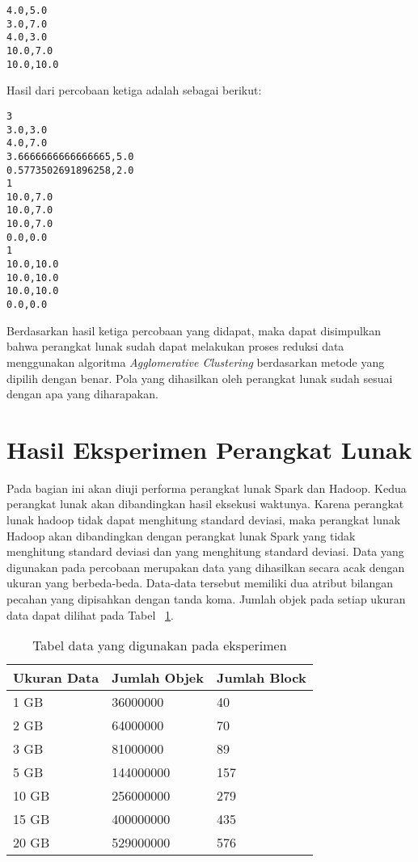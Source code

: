 \begin{itemize}
\begin{verbatim}
4.0,5.0
3.0,7.0
4.0,3.0
10.0,7.0
10.0,10.0
\end{verbatim}

Hasil dari percobaan ketiga adalah sebagai berikut:

\begin{verbatim}
3
3.0,3.0
4.0,7.0
3.6666666666666665,5.0
0.5773502691896258,2.0
1
10.0,7.0
10.0,7.0
10.0,7.0
0.0,0.0
1
10.0,10.0
10.0,10.0
10.0,10.0
0.0,0.0
\end{verbatim}

 
\end{itemize}

Berdasarkan hasil ketiga percobaan yang didapat, maka dapat disimpulkan bahwa perangkat lunak sudah dapat melakukan proses reduksi data menggunakan algoritma \textit{Agglomerative Clustering} berdasarkan metode yang dipilih dengan benar. Pola yang dihasilkan oleh perangkat lunak sudah sesuai dengan apa yang diharapakan.

\section{Hasil Eksperimen Perangkat Lunak}

Pada bagian ini akan diuji performa perangkat lunak Spark dan Hadoop. Kedua perangkat lunak akan dibandingkan hasil eksekusi waktunya. Karena perangkat lunak hadoop tidak dapat menghitung standard deviasi, maka perangkat lunak Hadoop akan dibandingkan dengan perangkat lunak Spark yang tidak menghitung standard deviasi dan yang menghitung standard deviasi. Data yang digunakan pada percobaan merupakan data yang dihasilkan secara acak dengan ukuran yang berbeda-beda. Data-data tersebut memiliki dua atribut bilangan pecahan yang dipisahkan dengan tanda koma. Jumlah objek pada setiap ukuran data dapat dilihat pada Tabel ~\ref{tab:exdata}.\\

\begin{table}[H] 
	\centering 
	\caption{Tabel data yang digunakan pada eksperimen}
	\label{tab:exdata}
	\begin{tabular}{|p{2cm}|p{2cm}|p{4cm}|}
\hline
Ukuran Data & Jumlah Objek  & Jumlah Block\\
\hline
1 GB & 36000000 & 40 \\
\hline
2 GB & 64000000 & 70 \\
\hline
3 GB & 81000000 & 89 \\
\hline
5 GB & 144000000 & 157 \\
\hline
10 GB & 256000000 & 279 \\
\hline
15 GB & 400000000 & 435 \\
\hline
20 GB & 529000000 & 576 \\
\hline
	\end{tabular} 
\end{table}




